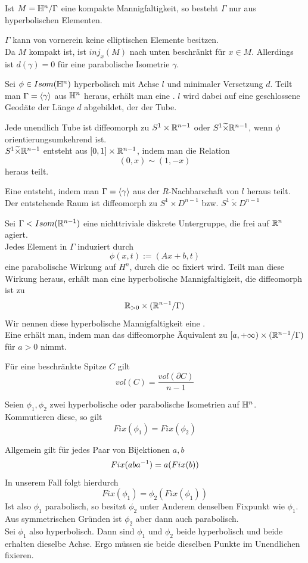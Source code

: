 \documentclass{book}
\begin{document}
\Kor{}
Ist $M = \mathbb{H}^n / \Gamma$ eine kompakte Mannigfaltigkeit, so besteht $\Gamma$ nur aus hyperbolischen Elementen.
\begin{Beweis}{}
	$\Gamma$ kann von vornerein keine elliptischen Elemente besitzen.\\
	Da $M$ kompakt ist, ist $inj_x(M)$ nach unten beschränkt für $x \in M$. Allerdings ist $d(\gamma) = 0$ für eine parabolische Isometrie $\gamma$.
\end{Beweis}

Sei $\phi \in Isom(\mathbb{H}^n)$ hyperbolisch mit Achse $l$ und minimaler Versetzung $d$. Teilt man $\Gamma = \left<\gamma\right>$ aus $\mathbb{H}^n$ heraus, erhält man eine . $l$ wird dabei auf eine geschlossene Geodäte der Länge $d$ abgebildet, der  der Tube.

\Prop{}
Jede unendlich Tube ist diffeomorph zu $S^1 \times \mathbb{R}^{n-1}$ oder $S^1 \widetilde{\times} \mathbb{R}^{n-1}$, wenn $\phi$ orientierungsumkehrend ist.\\
$S^1 \widetilde{\times} \mathbb{R}^{n-1}$ entsteht aus $[0,1] \times  \mathbb{R}^{n-1}$, indem man die Relation
\[ (0,x) \sim (1, -x) \]
heraus teilt.

\Def{}
Eine  entsteht, indem man $\Gamma = \left<\gamma\right>$ aus der $R$-Nachbarschaft von $l$ heraus teilt. Der entstehende Raum ist diffeomorph zu $S^1 \times D^{n-1}$ bzw. $S^1 \widetilde{\times} D^{n-1}$

Sei $\Gamma < Isom(\mathbb{R}^{n-1})$ eine nichttriviale diskrete Untergruppe, die frei auf $\mathbb{R}^n$ agiert.\\
Jedes Element in $\Gamma$ induziert durch
\[ \phi(x,t) := (Ax + b, t) \]
eine parabolische Wirkung auf $H^n$, durch die $\infty$ fixiert wird. Teilt man diese Wirkung heraus, erhält man eine hyperbolische Mannigfaltigkeit, die diffeomorph ist zu
\[ \mathbb{R}_{> 0} \times (\mathbb{R}^{n-1} / \Gamma) \]
Wir nennen diese hyperbolische Mannigfaltigkeit eine .\\
Eine  erhält man, indem man das diffeomorphe Äquivalent zu $[a,+\infty) \times (\mathbb{R}^{n-1} / \Gamma)$ für $a > 0$ nimmt.

\Prop{}
Für eine beschränkte Spitze $C$ gilt
\[ vol(C) = \frac{vol(\partial C)}{n-1} \]

\Lem{}
\label{Kommutieren}
Seien $\phi_1,\phi_2$ zwei hyperbolische oder parabolische Isometrien auf $\mathbb{H}^n$. Kommutieren diese, so gilt
\[ Fix(\phi_1) = Fix(\phi_2) \]
\begin{Beweis}{}
	Allgemein gilt für jedes Paar von Bijektionen $a,b$
	\[ Fix(aba^{-1}) = a(Fix(b)) \]
	In unserem Fall folgt hierdurch
	\[ Fix(\phi_1) = \phi_2(Fix(\phi_1)) \]
	Ist also $\phi_1$ parabolisch, so besitzt $\phi_2$ unter Anderem denselben Fixpunkt wie $\phi_1$. Aus symmetrischen Gründen ist $\phi_2$ aber dann auch parabolisch.\\
	Sei $\phi_1$ also hyperbolisch. Dann sind $\phi_1$ und $\phi_2$ beide hyperbolisch und beide erhalten dieselbe Achse. Ergo müssen sie beide dieselben Punkte im Unendlichen fixieren.
\end{Beweis}
\end{document}
